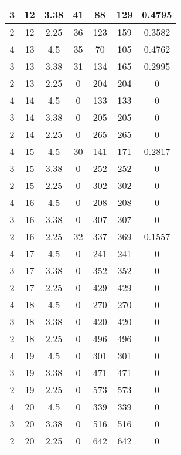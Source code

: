 \documentclass[letterpaper, 12pt]{article}
\begin{document}
\begin{longtable}{|c|c|c|c|c|c|c|}
\hline
3 & 12 & 3.38 & 41 & 88 & 129 & 0.4795 \\
\hline
2 & 12 & 2.25 & 36 & 123 & 159 & 0.3582 \\
\hline
4 & 13 & 4.5 & 35 & 70 & 105 & 0.4762 \\
\hline
3 & 13 & 3.38 & 31 & 134 & 165 & 0.2995 \\
\hline
2 & 13 & 2.25 & 0 & 204 & 204 & 0 \\
\hline
4 & 14 & 4.5 & 0 & 133 & 133 & 0 \\
\hline
3 & 14 & 3.38 & 0 & 205 & 205 & 0 \\
\hline
2 & 14 & 2.25 & 0 & 265 & 265 & 0 \\
\hline
4 & 15 & 4.5 & 30 & 141 & 171 & 0.2817 \\
\hline
3 & 15 & 3.38 & 0 & 252 & 252 & 0 \\
\hline
2 & 15 & 2.25 & 0 & 302 & 302 & 0 \\
\hline
4 & 16 & 4.5 & 0 & 208 & 208 & 0 \\
\hline
3 & 16 & 3.38 & 0 & 307 & 307 & 0 \\
\hline
2 & 16 & 2.25 & 32 & 337 & 369 & 0.1557 \\
\hline
4 & 17 & 4.5 & 0 & 241 & 241 & 0 \\
\hline
3 & 17 & 3.38 & 0 & 352 & 352 & 0 \\
\hline
2 & 17 & 2.25 & 0 & 429 & 429 & 0 \\
\hline
4 & 18 & 4.5 & 0 & 270 & 270 & 0 \\
\hline
3 & 18 & 3.38 & 0 & 420 & 420 & 0 \\
\hline
2 & 18 & 2.25 & 0 & 496 & 496 & 0 \\
\hline
4 & 19 & 4.5 & 0 & 301 & 301 & 0 \\
\hline
3 & 19 & 3.38 & 0 & 471 & 471 & 0 \\
\hline
2 & 19 & 2.25 & 0 & 573 & 573 & 0 \\
\hline
4 & 20 & 4.5 & 0 & 339 & 339 & 0 \\
\hline
3 & 20 & 3.38 & 0 & 516 & 516 & 0 \\
\hline
2 & 20 & 2.25 & 0 & 642 & 642 & 0 \\
\hline
\end{longtable}
\end{document}
